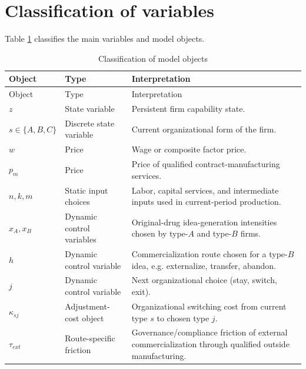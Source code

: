 \documentclass[12pt]{article}
\begin{document}
\section{Classification of variables}

Table \ref{tab:objects} classifies the main variables and model objects.

\begin{longtable}{p{}p{}p{}}
\caption{Classification of model objects}\label{tab:objects}\\
\toprule
Object & Type & Interpretation \\
\midrule
\endfirsthead
\toprule
Object & Type & Interpretation \\
\midrule
\endhead

$z$ & State variable & Persistent firm capability state. \\[0.4em]

$s\in\{A,B,C\}$ & Discrete state variable & Current organizational form of the firm. \\[0.4em]

$w$ & Price & Wage or composite factor price. \\[0.4em]

$p_m$ & Price & Price of qualified contract-manufacturing services. \\[0.4em]

$n,k,m$ & Static input choices & Labor, capital services, and intermediate inputs used in current-period production. \\[0.4em]

$x_A,x_B$ & Dynamic control variables & Original-drug idea-generation intensities chosen by type-$A$ and type-$B$ firms. \\[0.4em]

$h$ & Dynamic control variable & Commercialization route chosen for a type-$B$ idea, e.g. externalize, transfer, abandon. \\[0.4em]

$j$ & Dynamic control variable & Next organizational choice (stay, switch, exit). \\[0.4em]

$\kappa_{sj}$ & Adjustment-cost object & Organizational switching cost from current type $s$ to chosen type $j$. \\[0.4em]

$\tau_{ext}$ & Route-specific friction & Governance/compliance friction of external commercialization through qualified outside manufacturing. \\[0.4em]


\end{longtable}
\end{document}
